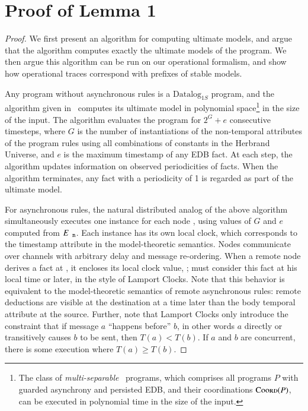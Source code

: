 \section{Proof of Lemma 1}
\begin{proof}
We first present an algorithm for computing ultimate models, and argue that the algorithm computes exactly the ultimate models of the \lang program.  We then argue this algorithm can be run on our operational formalism, and show how operational traces correspond with prefixes of stable models.

Any \lang program without asynchronous rules is a $\text{Datalog}_{1S}$
program, and the algorithm given in~\cite{tdd} computes its ultimate model in
polynomial space\footnote{The class of {\em multi-separable}~\cite{tdd-poly}
\lang programs, which comprises all \lang programs $P$ with guarded asynchrony
and persisted EDB, and their coordinations $\textsc{Coord}(P)$, can be executed
in polynomial time in the size of the input.} in the size of the input.  The
algorithm evaluates the program for $2^G + e$ consecutive timesteps, where $G$
is the number of instantiations of the non-temporal attributes of the program
rules using all combinations of constants in the Herbrand Universe, and $e$ is
the maximum timestamp of any EDB fact.  At each step, the algorithm updates
information on observed periodicities of facts.  When the algorithm terminates,
any fact with a periodicity of 1 is regarded as part of the ultimate model.

For asynchronous rules, the natural distributed analog of the above algorithm
simultaneously executes one instance for each node , using values of
$G$ and $e$ computed from $E_{\text{\dedalus{{\scriptsize n}}}}$.  Each
instance has its own local clock, which corresponds to the timestamp attribute
in the model-theoretic semantics.  Nodes communicate over channels with
arbitrary delay and message re-ordering.  When a remote node 
derives a fact at , it encloses its local clock value, ;
 must consider this fact at his local time  or later, in
the style of Lamport Clocks.  Note that this behavior is equivalent to the
model-theoretic semantics of remote asynchronous rules: remote deductions are
visible at the destination at a time later than the body temporal attribute at
the source.  Further, note that Lamport Clocks only introduce the constraint
that if message $a$ ``happens before'' $b$, in other words $a$ directly or
transitively causes $b$ to be sent, then $T(a) < T(b)$.  If $a$ and $b$ are
concurrent, there is some execution where $T(a) \geq T(b)$.


\end{proof}
